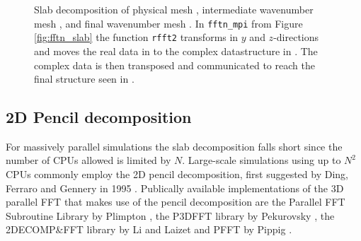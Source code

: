 \documentclass[final,3p,times,twocolumn]{elsarticle}
\newcommand{\inpyth}{\lstinline[style=inlinestyle]} %[]%
\begin{document}
\begin{figure}[th!]
{  \label{slabsubfig1}
}
\caption{Slab decomposition of physical mesh , intermediate 
wavenumber mesh , and final wavenumber mesh 
. In \inpyth{fftn_mpi} from Figure \ref{fig:fftn_slab} the 
function \inpyth{rfft2} 
transforms in $y$ and $z$-directions and moves the real data in 
 to the complex datastructure in . The 
complex data is then transposed and communicated to reach the final structure 
seen in . }
\label{fig:Slabdecomp}
\end{figure}

\subsection{2D Pencil decomposition}
\label{pencil2D}

For massively parallel simulations the slab decomposition falls short since the number of CPUs allowed is limited by $N$. Large-scale simulations using up to $N^2$ CPUs commonly employ the 2D pencil decomposition, first suggested by Ding, Ferraro and Gennery in 1995 \cite{Ding95}. Publically available implementations of the 3D parallel FFT that makes use of the pencil decomposition are the Parallel FFT Subroutine Library by Plimpton \cite{PlimptonFFT}, the P3DFFT library by Pekurovsky \cite{p3dfft, pekurovsky2012}, the 2DECOMP\&FFT library by Li and Laizet \cite{Li2010} and PFFT by Pippig \cite{Pi13}.
\end{document}
